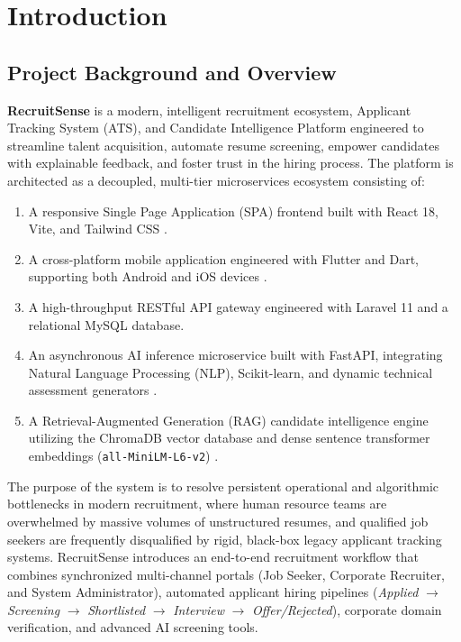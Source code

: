 \chapter{Introduction} \label{chap:intro}

\section{Project Background and Overview}
\textbf{RecruitSense} is a modern, intelligent recruitment ecosystem, Applicant Tracking System (ATS), and Candidate Intelligence Platform engineered to streamline talent acquisition, automate resume screening, empower candidates with explainable feedback, and foster trust in the hiring process. The platform is architected as a decoupled, multi-tier microservices ecosystem consisting of:
\begin{enumerate}
    \item A responsive Single Page Application (SPA) frontend built with React 18, Vite, and Tailwind CSS \cite{fielding2000rest}.
    \item A cross-platform mobile application engineered with Flutter and Dart, supporting both Android and iOS devices \cite{flutter2022google}.
    \item A high-throughput RESTful API gateway engineered with Laravel 11 and a relational MySQL database.
    \item An asynchronous AI inference microservice built with FastAPI, integrating Natural Language Processing (NLP), Scikit-learn, and dynamic technical assessment generators \cite{ramirez2019fastapi, roy2020resume}.
    \item A Retrieval-Augmented Generation (RAG) candidate intelligence engine utilizing the ChromaDB vector database and dense sentence transformer embeddings (\texttt{all-MiniLM-L6-v2}) \cite{lewis2020rag, reimers2019sentence, malkov2018hnsw}.
\end{enumerate}

The purpose of the system is to resolve persistent operational and algorithmic bottlenecks in modern recruitment, where human resource teams are overwhelmed by massive volumes of unstructured resumes, and qualified job seekers are frequently disqualified by rigid, black-box legacy applicant tracking systems. RecruitSense introduces an end-to-end recruitment workflow that combines synchronized multi-channel portals (Job Seeker, Corporate Recruiter, and System Administrator), automated applicant hiring pipelines (\textit{Applied} $\rightarrow$ \textit{Screening} $\rightarrow$ \textit{Shortlisted} $\rightarrow$ \textit{Interview} $\rightarrow$ \textit{Offer/Rejected}), corporate domain verification, and advanced AI screening tools. 

